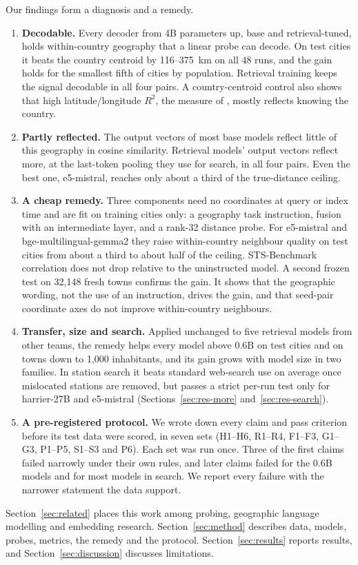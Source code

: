 Our findings form a diagnosis and a remedy.
\begin{enumerate}
\item \textbf{Decodable.} Every decoder from 4B parameters up, base and retrieval-tuned, holds within-country geography that a linear probe can decode. On test cities it beats the country centroid by 116--375~km on all 48 runs, and the gain holds for the smallest fifth of cities by population. Retrieval training keeps the signal decodable in all four pairs. A country-centroid control also shows that high latitude/longitude $R^2$, the measure of \citet{gurnee2024space}, mostly reflects knowing the country.
\item \textbf{Partly reflected.} The output vectors of most base models reflect little of this geography in cosine similarity. Retrieval models' output vectors reflect more, at the last-token pooling they use for search, in all four pairs. Even the best one, e5-mistral, reaches only about a third of the true-distance ceiling.
\item \textbf{A cheap remedy.} Three components need no coordinates at query or index time and are fit on training cities only: a geography task instruction, fusion with an intermediate layer, and a rank-32 distance probe. For e5-mistral and bge-multilingual-gemma2 they raise within-country neighbour quality on test cities from about a third to about half of the ceiling. STS-Benchmark correlation does not drop relative to the uninstructed model. A second frozen test on 32,148 fresh towns confirms the gain. It shows that the geographic wording, not the use of an instruction, drives the gain, and that seed-pair coordinate axes \citep{feuerstein2026recovering} do not improve within-country neighbours.
\item \textbf{Transfer, size and search.} Applied unchanged to five retrieval models from other teams, the remedy helps every model above 0.6B on test cities and on towns down to 1,000 inhabitants, and its gain grows with model size in two families. In station search it beats standard web-search use on average once mislocated stations are removed, but passes a strict per-run test only for harrier-27B and e5-mistral (Sections~\ref{sec:res-more} and~\ref{sec:res-search}).
\item \textbf{A pre-registered protocol.} We wrote down every claim and pass criterion before its test data were scored, in seven sets (H1--H6, R1--R4, F1--F3, G1--G3, P1--P5, S1--S3 and P6). Each set was run once. Three of the first claims failed narrowly under their own rules, and later claims failed for the 0.6B models and for most models in search. We report every failure with the narrower statement the data support.
\end{enumerate}

Section~\ref{sec:related} places this work among probing, geographic language modelling and embedding research. Section~\ref{sec:method} describes data, models, probes, metrics, the remedy and the protocol. Section~\ref{sec:results} reports results, and Section~\ref{sec:discussion} discusses limitations.
